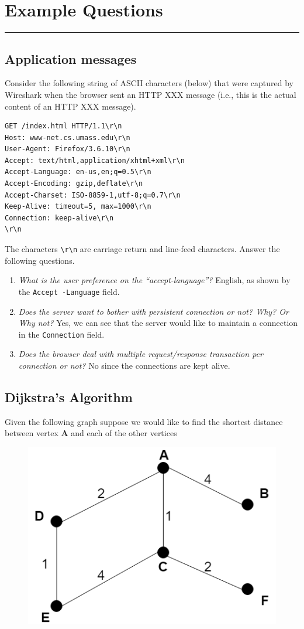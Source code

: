 \documentclass{article}
\begin{document}
\section*{Example Questions}
\noindent
\rule{\linewidth}{0.5mm}
\noindent

\subsection*{Application messages}
Consider the following string of ASCII characters (below) that were captured by Wireshark when the browser sent an HTTP XXX message (i.e., this is the actual content of an HTTP XXX message).
\begin{lstlisting}
GET /index.html HTTP/1.1\r\n
Host: www-net.cs.umass.edu\r\n
User-Agent: Firefox/3.6.10\r\n
Accept: text/html,application/xhtml+xml\r\n
Accept-Language: en-us,en;q=0.5\r\n
Accept-Encoding: gzip,deflate\r\n
Accept-Charset: ISO-8859-1,utf-8;q=0.7\r\n
Keep-Alive: timeout=5, max=1000\r\n
Connection: keep-alive\r\n
\r\n
\end{lstlisting}
The characters \texttt{\textbackslash r\textbackslash n} are carriage return and line-feed characters. Answer the following questions.

\begin{enumerate}
    \item {\it What is the user preference on the “accept-language”?} English, as shown by the \texttt{Accept -Language} field.
    \item {\it Does the server want to bother with persistent connection or not? Why? Or Why not?} Yes, we can see that the server would like to maintain a connection in the \texttt{Connection} field.
    \item {\it Does the browser deal with multiple request/response transaction per connection or not?} No since the connections are kept alive.
\end{enumerate}

\subsection*{Dijkstra's Algorithm}
Given the following graph suppose we would like to find the shortest distance between vertex {\bf A} and each of the other vertices

\begin{figure}[H]
    \includegraphics[scale=0.5]{images/COMS_review_dj.png}
    \centering
\end{figure}
\end{document}
